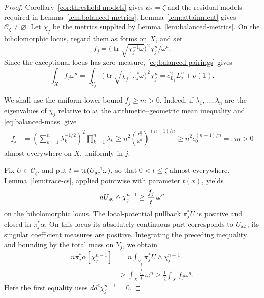 \documentclass[reqno]{amsart}
\numberwithin{equation}{section}
\theoremstyle{definition}
\DeclareMathOperator{\tr}{tr}
\newcommand{\ddc}{dd^c}
\begin{document}
\begin{proof}
Corollary~\ref{cor:threshold-models} gives $a_*=\zeta$ and the residual models required in Lemma~\ref{lem:balanced-metrics}. Lemma~\ref{lem:attainment} gives $\mathcal C_\zeta\ne\varnothing$.
Let $\chi_j$ be the metrics supplied by Lemma~\ref{lem:balanced-metrics}. On the biholomorphic locus, regard them as forms on $X$, and set
\[
 f_j=\bigl(\tr\sqrt{\chi_j^{-1}\omega}\bigr)^2\chi_j^n/\omega^n.
\]
Since the exceptional locus has zero measure, \eqref{eq:balanced-pairings} gives
\[
 \int_X f_j\omega^n=\int_{Y_j}
 \bigl(\tr\sqrt{\chi_j^{-1}\pi_j^*\omega}\bigr)^2\chi_j^n=c_{L_j}^2L_j^n+o(1).
\]

We shall use the uniform lower bound $f_j\ge m>0$.
Indeed, if $\lambda_1,\ldots,\lambda_n$ are the eigenvalues of
$\chi_j$ relative to $\omega$, the arithmetic--geometric mean
inequality and \eqref{eq:balanced-mass} give
\[
\begin{aligned}
f_j
&=\left(\sum_{k=1}^n\lambda_k^{-1/2}\right)^2
  \prod_{k=1}^n\lambda_k\ge n^2\left(\frac{\chi_j^n}{\omega^n}\right)^{(n-1)/n}
 \ge n^2c_0^{(n-1)/n}=:m>0
\end{aligned}
\]
almost everywhere on $X$, uniformly in $j$.

Fix $U\in\mathcal C_\zeta$, and put
$t=\tr(U_{\rm ac}^{-1}\omega)$, so that
$0<t\le\zeta$ almost everywhere.
Lemma~\ref{lem:trace-cs}, applied pointwise
with parameter $t(x)$, yields
\[
nU_{\rm ac}\wedge\chi_j^{n-1}\ge\frac{f_j}{t}\,\omega^n
\]
on the biholomorphic locus.
The local-potential pullback $\pi_j^*U$ is positive and closed
in $\pi_j^*\alpha$. On this locus its absolutely continuous
part corresponds to $U_{\rm ac}$; its singular coefficient
measures are positive. Integrating the preceding inequality
and bounding by the total mass on $Y_j$, we obtain
\begin{equation}\label{eq:pairing-bound}
\begin{aligned}
n\pi_j^*\alpha[\chi_j^{n-1}]
&=n\int_{Y_j}\pi_j^*U\wedge \chi_j^{n-1}\\
&\ge\int_X\frac{f_j}{t}\,\omega^n
 \ge\frac1\zeta\int_X f_j\omega^n.
\end{aligned}
\end{equation}
Here the first equality uses $\ddc \chi_j^{n-1}=0$.


\end{proof}
\end{document}
